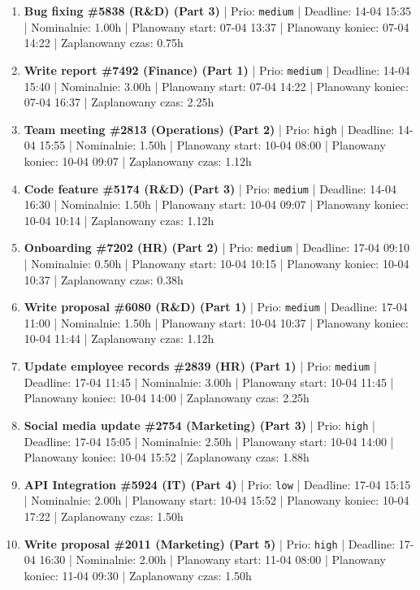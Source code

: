 {\begin{enumerate}
  \item [\textbf{14637}] \textbf{Bug fixing \#5838 (R\&D) (Part 3)} | Prio: \texttt{medium} | Deadline: 14-04 15:35 | Nominalnie: 1.00h | Planowany start: 07-04 13:37 | Planowany koniec: 07-04 14:22 | Zaplanowany czas: 0.75h
  \item [\textbf{14642}] \textbf{Write report \#7492 (Finance) (Part 1)} | Prio: \texttt{medium} | Deadline: 14-04 15:40 | Nominalnie: 3.00h | Planowany start: 07-04 14:22 | Planowany koniec: 07-04 16:37 | Zaplanowany czas: 2.25h
  \item [\textbf{14617}] \textbf{Team meeting \#2813 (Operations) (Part 2)} | Prio: \texttt{high} | Deadline: 14-04 15:55 | Nominalnie: 1.50h | Planowany start: 10-04 08:00 | Planowany koniec: 10-04 09:07 | Zaplanowany czas: 1.12h
  \item [\textbf{14646}] \textbf{Code feature \#5174 (R\&D) (Part 3)} | Prio: \texttt{medium} | Deadline: 14-04 16:30 | Nominalnie: 1.50h | Planowany start: 10-04 09:07 | Planowany koniec: 10-04 10:14 | Zaplanowany czas: 1.12h
  \item [\textbf{14648}] \textbf{Onboarding \#7202 (HR) (Part 2)} | Prio: \texttt{medium} | Deadline: 17-04 09:10 | Nominalnie: 0.50h | Planowany start: 10-04 10:15 | Planowany koniec: 10-04 10:37 | Zaplanowany czas: 0.38h
  \item [\textbf{14669}] \textbf{Write proposal \#6080 (R\&D) (Part 1)} | Prio: \texttt{medium} | Deadline: 17-04 11:00 | Nominalnie: 1.50h | Planowany start: 10-04 10:37 | Planowany koniec: 10-04 11:44 | Zaplanowany czas: 1.12h
  \item [\textbf{14670}] \textbf{Update employee records \#2839 (HR) (Part 1)} | Prio: \texttt{medium} | Deadline: 17-04 11:45 | Nominalnie: 3.00h | Planowany start: 10-04 11:45 | Planowany koniec: 10-04 14:00 | Zaplanowany czas: 2.25h
  \item [\textbf{14611}] \textbf{Social media update \#2754 (Marketing) (Part 3)} | Prio: \texttt{high} | Deadline: 17-04 15:05 | Nominalnie: 2.50h | Planowany start: 10-04 14:00 | Planowany koniec: 10-04 15:52 | Zaplanowany czas: 1.88h
  \item [\textbf{14696}] \textbf{API Integration \#5924 (IT) (Part 4)} | Prio: \texttt{low} | Deadline: 17-04 15:15 | Nominalnie: 2.00h | Planowany start: 10-04 15:52 | Planowany koniec: 10-04 17:22 | Zaplanowany czas: 1.50h
  \item [\textbf{14628}] \textbf{Write proposal \#2011 (Marketing) (Part 5)} | Prio: \texttt{high} | Deadline: 17-04 16:30 | Nominalnie: 2.00h | Planowany start: 11-04 08:00 | Planowany koniec: 11-04 09:30 | Zaplanowany czas: 1.50h

\end{enumerate}}
